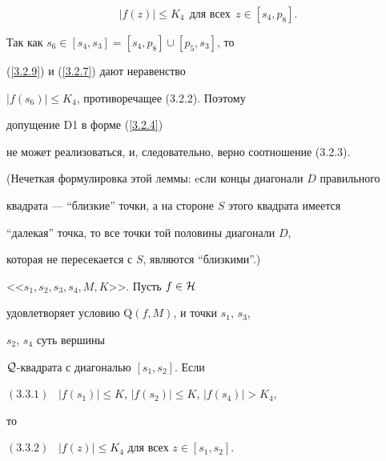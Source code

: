 \begin{pf}
\begin{equation}


\label{3.2.9}


|f(z)| \leq K_4 \ \ \text{для всех} \ \ z\in [s_4, p_8].


\end{equation} 


Так как $s_6 \in [s_4, s_3] = [s_4, p_8] \cup [p_5, s_3]$, то 


(\ref{3.2.9}) и (\ref{3.2.7}) дают неравенство 


$|f(s_6)| \leq K_4$, противоречащее (3.2.2). Поэтому 


допущение D1 в форме (\ref{3.2.4})


не может реализоваться, и, следовательно, верно соотношение (3.2.3).


\end{pf}





(Нечеткая формулировка этой леммы: eсли концы диагонали $D$ правильного 


квадрата --- ``близкие'' точки, а на стороне $S$ этого квадрата имеется 


``далекая'' точка, то все точки той половины диагонали $D$, 


которая не пересекается с $S$, являются ``близкими''.) 





\begin{lems}


<<$s_1, s_2, s_3, s_4, M, K$>>. Пусть $f\in{\cal H}$ 


удовлетворяет условию $\mathrm Q(f,M)$, и точки $s_1$, $s_3$,


$s_2$, $s_4$ суть вершины 


${\cal Q}$-квадрата с диагональю $[s_1, s_2]$. Если 





$(3.3.1)$ \ $|f(s_1)| \leq K$, $|f(s_2)| \leq K$, $|f(s_4)| > K_4$, 





\noindent{}то





$(3.3.2)$ \ $|f(z)| \leq K_4$ для всех $z\in[s_1, s_2]$.


\end{lems}





